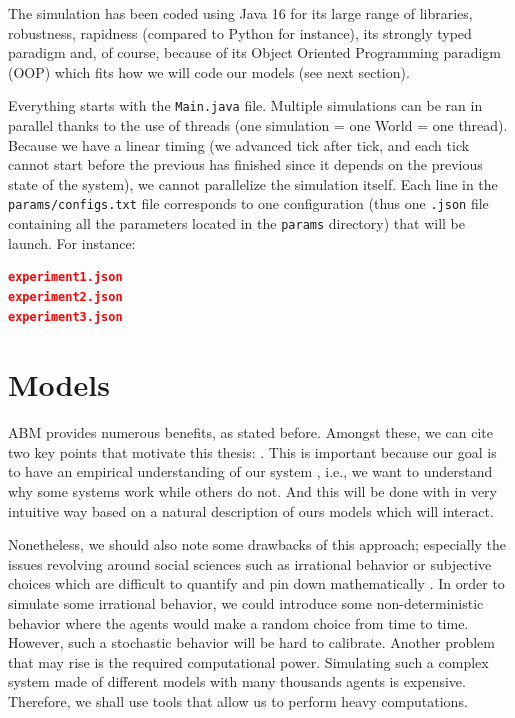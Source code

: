     The simulation has been coded using Java 16 for its large range of libraries, robustness, rapidness (compared to Python for instance), its strongly typed paradigm and, of course, because of its Object Oriented Programming paradigm (OOP) which fits how we will code our models (see next section).

    Everything starts with the \texttt{Main.java} file. Multiple simulations can be ran in parallel thanks to the use of threads (one simulation = one World = one thread). Because we have a linear timing (we advanced tick after tick, and each tick cannot start before the previous has finished since it depends on the previous state of the system), we cannot parallelize the simulation itself. Each line in the \texttt{params/configs.txt} file corresponds to one configuration (thus one \texttt{.json} file containing all the parameters located in the \texttt{params} directory) that will be launch. For instance:

    \begin{lstlisting}[language=json,firstnumber=1]
experiment1.json
experiment2.json
experiment3.json
    \end{lstlisting}



\section{Models}\label{section:models}

ABM provides numerous benefits, as stated before. Amongst these, we can cite two key points that motivate this thesis: . This is important because our goal is to have an empirical understanding of our system \cite{tesfatsion_handbook}, i.e., we want to understand why some systems work while others do not. And this will be done with in very intuitive way based on a natural description of ours models which will interact.

Nonetheless, we should also note some drawbacks of this approach; especially the issues revolving around social sciences such as irrational behavior or subjective choices which are difficult to quantify and pin down mathematically \cite{ABM}. In order to simulate some irrational behavior, we could introduce some non-deterministic behavior where the agents would make a random choice from time to time. However, such a stochastic behavior will be hard to calibrate. 
Another problem that may rise is the required computational power. Simulating such a complex system made of different models with many thousands agents is expensive. Therefore, we shall use tools that allow us to perform heavy computations. 

